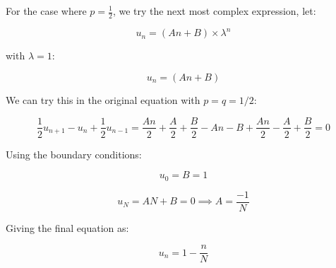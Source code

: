 \documentclass{article}
\begin{document}
For the case where $p = \frac{1}{2}$, we try the next most complex expression, let:

$$u_n = (An + B) \times \lambda^n$$

with $\lambda = 1$:

$$u_n = (An + B)$$

We can try this in the original equation with $p=q=1/2$:

$$\frac{1}{2} u_{n+1} - u_n + \frac{1}{2} u_{n-1} = \frac{An}{2} + \frac{A}{2} + \frac{B}{2} - An -B + \frac{An}{2} - \frac{A}{2} + \frac{B}{2} = 0$$

Using the boundary conditions:

$$u_0 = B = 1$$

$$u_N = AN + B = 0 \implies A = \frac{-1}{N}$$

Giving the final equation as:

\begin{equation}
    u_n = 1 - \frac{n}{N}
\end{equation}

\end{document}
